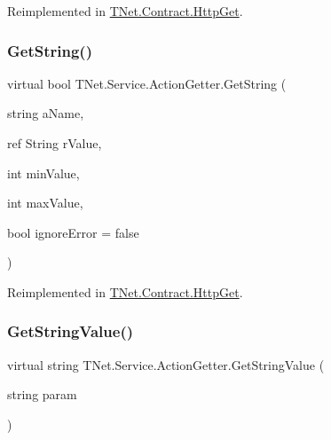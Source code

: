 Reimplemented in \mbox{\hyperlink{class_t_net_1_1_contract_1_1_http_get_ade64b775a2fe61cac8737571ab66d7e2}{T\+Net.\+Contract.\+Http\+Get}}.

\mbox{\label{class_t_net_1_1_service_1_1_action_getter_acf7a917329a995f0ae9ba3977db3cbf0}} 
\subsubsection{\texorpdfstring{Get\+String()}{GetString()}\hspace{0.1cm}{\footnotesize\ttfamily [3/3]}}
{\footnotesize\ttfamily virtual bool T\+Net.\+Service.\+Action\+Getter.\+Get\+String (\begin{DoxyParamCaption}\item[{string}]{a\+Name,  }\item[{ref String}]{r\+Value,  }\item[{int}]{min\+Value,  }\item[{int}]{max\+Value,  }\item[{bool}]{ignore\+Error = {\ttfamily false} }\end{DoxyParamCaption})\hspace{0.3cm}{\ttfamily [virtual]}}







Reimplemented in \mbox{\hyperlink{class_t_net_1_1_contract_1_1_http_get_a7f5bba3c6d5f753e751e3985ff95e4c7}{T\+Net.\+Contract.\+Http\+Get}}.

\mbox{\label{class_t_net_1_1_service_1_1_action_getter_a35e4f3f9255c3fdb020839d30d8e7e22}} 
\subsubsection{\texorpdfstring{Get\+String\+Value()}{GetStringValue()}\hspace{0.1cm}{\footnotesize\ttfamily [1/2]}}
{\footnotesize\ttfamily virtual string T\+Net.\+Service.\+Action\+Getter.\+Get\+String\+Value (\begin{DoxyParamCaption}\item[{string}]{param }\end{DoxyParamCaption})\hspace{0.3cm}{\ttfamily [virtual]}}








